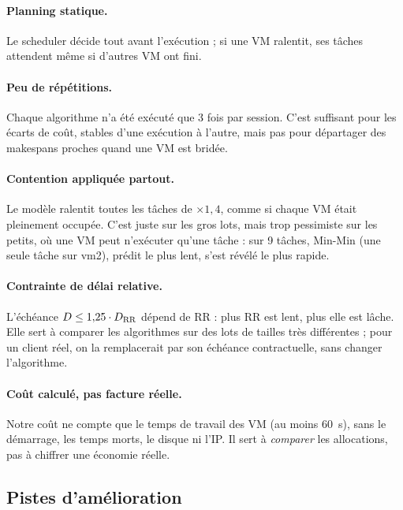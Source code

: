\paragraph{Planning statique.} Le scheduler décide tout avant l'exécution ; si une
VM ralentit, ses tâches attendent même si d'autres VM ont fini.

\paragraph{Peu de répétitions.} Chaque algorithme n'a été exécuté que 3 fois par
session. C'est suffisant pour les écarts de coût, stables d'une exécution à
l'autre, mais pas pour départager des makespans proches quand une VM est bridée.

\paragraph{Contention appliquée partout.} Le modèle ralentit toutes les tâches
de $\times 1{,}4$, comme si chaque VM était pleinement occupée. C'est juste sur les
gros lots, mais trop pessimiste sur les petits, où une VM peut n'exécuter qu'une
tâche : sur 9 tâches, Min-Min (une seule tâche sur vm2), prédit le plus lent,
s'est révélé le plus rapide.

\paragraph{Contrainte de délai relative.} L'échéance $D \le 1{,}25 \cdot D_{\mathrm{RR}}$
dépend de RR : plus RR est lent, plus elle est lâche. Elle sert à comparer les
algorithmes sur des lots de tailles très différentes ; pour un client réel, on la
remplacerait par son échéance contractuelle, sans changer l'algorithme.

\paragraph{Coût calculé, pas facture réelle.} Notre coût ne compte que le temps
de travail des VM (au moins 60~s), sans le démarrage, les temps morts, le
disque ni l'IP. Il sert à \emph{comparer} les allocations, pas à chiffrer une
économie réelle.

\subsection{Pistes d'amélioration}

